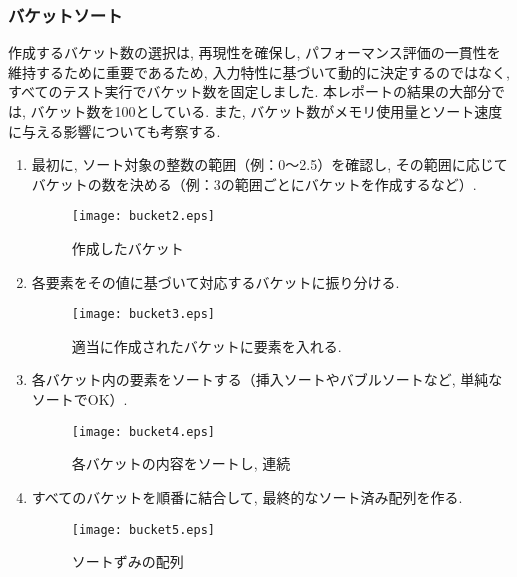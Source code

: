 \documentclass[a4j, 12pt]{jarticle}
\begin{document}
\subsubsection{バケットソート}
作成するバケット数の選択は, 再現性を確保し, パフォーマンス評価の一貫性を維持するために重要であるため, 入力特性に基づいて動的に決定するのではなく, すべてのテスト実行でバケット数を固定しました. 本レポートの結果の大部分では, バケット数を100としている. また, バケット数がメモリ使用量とソート速度に与える影響についても考察する. \cite{gfg:bucketsort2024}\\
\begin{enumerate}
  \begin{figure}[H]
    \centering
    \texttt{[image: bucket1.eps]}
    \caption{ソート対象データ}
  \end{figure}
  \item 最初に, ソート対象の整数の範囲（例：0〜2.5）を確認し, その範囲に応じてバケットの数を決める（例：3の範囲ごとにバケットを作成するなど）. 
  \begin{figure}[H]
    \centering
    \texttt{[image: bucket2.eps]}
    \caption{作成したバケット}
  \end{figure}
  \item 各要素をその値に基づいて対応するバケットに振り分ける. 
  \begin{figure}[H]
    \centering
    \texttt{[image: bucket3.eps]}
    \caption{適当に作成されたバケットに要素を入れる. }
  \end{figure}
  \newpage
  \item 各バケット内の要素をソートする（挿入ソートやバブルソートなど, 単純なソートでOK）. 
  \begin{figure}[H]
    \centering
    \texttt{[image: bucket4.eps]}
    \caption{各バケットの内容をソートし, 連続}
  \end{figure}
  \item すべてのバケットを順番に結合して, 最終的なソート済み配列を作る. 
  \begin{figure}[H]
    \centering
    \texttt{[image: bucket5.eps]}
    \caption{ソートずみの配列}
  \end{figure}
\end{enumerate}
\end{document}
